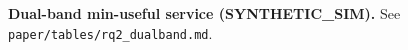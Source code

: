 \textbf{Dual-band min-useful service (SYNTHETIC\_SIM).} See \texttt{paper/tables/rq2\_dualband.md}.
